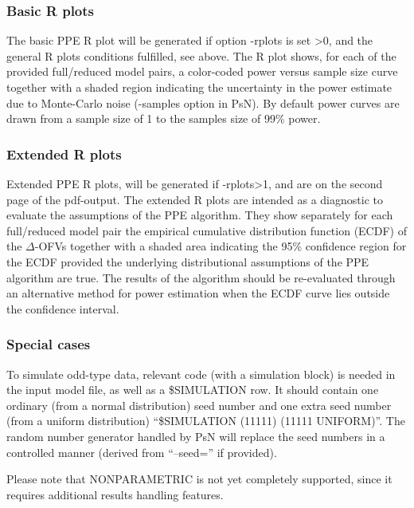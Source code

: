 \subsubsection*{Basic R plots}
The basic PPE R plot will be generated if option -rplots is set >0, and the general R plots conditions fulfilled, see above.
The R plot shows, for each of the provided full/reduced model pairs, a color-coded power versus sample size curve together with a shaded region indicating the uncertainty in the power estimate due to Monte-Carlo noise (-samples option in PsN). 
By default power curves are drawn from a sample size of 1 to the samples size of 99\% power. 

\subsubsection*{Extended R plots}
Extended PPE R plots, will be generated if -rplots>1, and are on the second page of the pdf-output. The extended R plots are intended as a diagnostic to evaluate the assumptions of the PPE algorithm. They show separately for each full/reduced model pair the empirical cumulative distribution function (ECDF) of the $\Delta$-OFVs together with a shaded area indicating the 95\% confidence region for the ECDF provided the underlying distributional assumptions of the PPE algorithm are true. The results of the algorithm should be re-evaluated through an alternative method for power estimation when the ECDF curve lies outside the confidence interval. 

\subsubsection*{Special cases}
To simulate odd-type data, relevant code (with a simulation block) is needed in the input model file, as well as a \$SIMULATION row. It should contain one ordinary (from a normal distribution) seed number and one extra seed number (from a uniform distribution) “\$SIMULATION (11111) (11111 UNIFORM)”. The random number generator handled by PsN will replace the seed numbers in a controlled manner (derived from “–seed=” if provided).

Please note that NONPARAMETRIC is not yet completely supported, since it requires additional results handling features.

